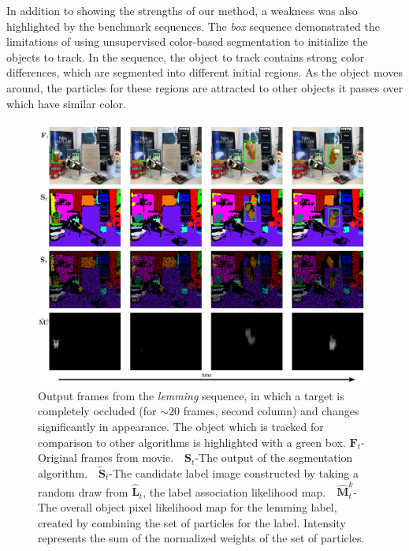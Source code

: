 In addition to showing the strengths of our method, a weakness was also highlighted by the benchmark sequences. The \textit{box} sequence demonstrated the limitations of using unsupervised color-based segmentation to initialize the objects to track. In the sequence, the object to track contains strong color differences, which are segmented into different initial regions. As the object moves around, the particles for these regions are attracted to other objects it passes over which have similar color.  


\begin{figure}[t]
\includegraphics[width=\linewidth]{figures/ECCV2012/Tracking.pdf}
  \caption[Tracked output from lemming sequence]{Output frames from the \textit{lemming} sequence, in which a target is completely occluded (for $\sim20$ frames, second column) and changes significantly in appearance. The object which is tracked for comparison to other algorithms is highlighted with a green box. $\mathbf{F}_t$-Original frames from  movie.~~$\mathbf{S}_t$-The output of the segmentation algorithm.~~$\tilde{\mathbf{S}}_{t}$-The candidate label image constructed by taking a random draw from $\hat{\mathbf{L}}_{t}$, the label association likelihood map.~~$\hat{\mathbf{M}}^k_{t}$-The overall object pixel likelihood map for the lemming label, created by combining the set of particles for the label. Intensity represents the sum of the normalized weights of the set of particles.}
\label{fig:Results}
\end{figure}

